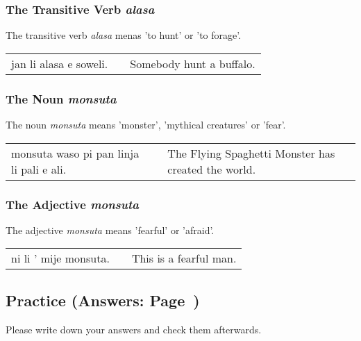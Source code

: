 %
\subsubsection*{The Transitive Verb \textit{alasa}}
%

The transitive verb \textit{alasa} menas 'to hunt' or 'to forage'.

\begin{supertabular}{p{5,5cm}|ll}
    jan li alasa e soweli. &  & Somebody hunt a buffalo. \\
\end{supertabular}

%
%
\subsubsection*{The Noun \textit{monsuta}}
%

The noun \textit{monsuta} means 'monster', 'mythical creatures' or 'fear'.

\begin{supertabular}{p{5,5cm}|ll}
    monsuta waso pi pan linja li pali e ali. &  & The Flying Spaghetti Monster has created the world. \\
\end{supertabular}

%
\subsubsection*{The Adjective \textit{monsuta}}
%

The adjective \textit{monsuta} means 'fearful' or 'afraid'.

\begin{supertabular}{p{5,5cm}|ll}
    ni li ' mije monsuta. &  & This is a fearful man. \\
\end{supertabular}

%
%
%
\newpage
%
\subsection*{Practice (Answers: Page~\pageref{'living_things'})}
%
Please write down your answers and check them afterwards.

